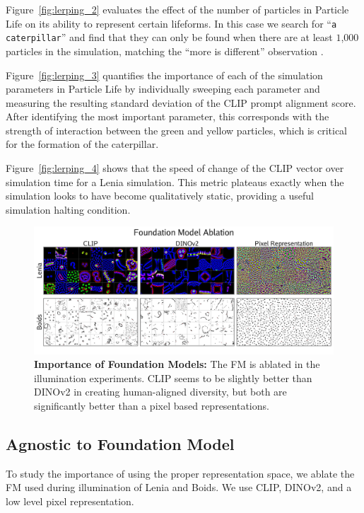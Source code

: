 \documentclass{article}
\begin{document}
Figure~\ref{fig:lerping_2} evaluates the effect of the number of particles in Particle Life on its ability to represent certain lifeforms.
In this case we search for ``\texttt{a caterpillar}'' and find that they can only be found when there are at least $1$,$000$ particles in the simulation, matching the ``more is different'' observation \citep{anderson1972more}.

Figure~\ref{fig:lerping_3} quantifies the importance of each of the simulation parameters in Particle Life by individually sweeping each parameter and measuring the resulting standard deviation of the CLIP prompt alignment score.
After identifying the most important parameter, this corresponds with the strength of interaction between the green and yellow particles, which is critical for the formation of the caterpillar.

Figure~\ref{fig:lerping_4} shows that the speed of change of the CLIP vector over simulation time for a Lenia simulation.
This metric plateaus exactly when the simulation looks to have become qualitatively static, providing a useful simulation halting condition.


\begin{figure}[ht]
  \centering
  \includegraphics[width=1.0\linewidth]{figs/fm_ablation_compressed.pdf}
  \vspace{-10mm}
  \caption{
        \textbf{Importance of Foundation Models:}
        The FM is ablated in the illumination experiments.
        CLIP seems to be slightly better than DINOv2 in creating human-aligned diversity, but both are significantly better than a pixel based representations.
  }
  \label{fig:fm_ablation}
\end{figure}



\subsection{Agnostic to Foundation Model}
To study the importance of using the proper representation space, we ablate the FM used during illumination of Lenia and Boids.
We use CLIP, DINOv2, and a low level pixel representation.
\end{document}
